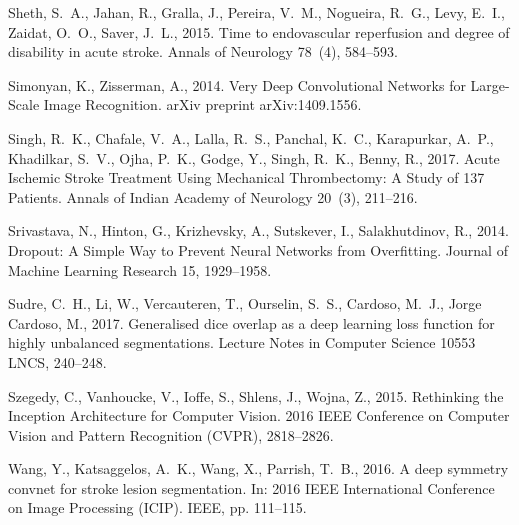 \documentclass[letterpaper,final,authoryear,3p,times,twocolumn]{elsarticle}
\begin{document}
\begin{thebibliography}{36}
Sheth, S.~A., Jahan, R., Gralla, J., Pereira, V.~M., Nogueira, R.~G., Levy,
  E.~I., Zaidat, O.~O., Saver, J.~L., 2015. {Time to endovascular reperfusion
  and degree of disability in acute stroke}. Annals of Neurology 78~(4),
  584--593.

Simonyan, K., Zisserman, A., 2014. {Very Deep Convolutional Networks for
  Large-Scale Image Recognition}. arXiv preprint arXiv:1409.1556.

Singh, R.~K., Chafale, V.~A., Lalla, R.~S., Panchal, K.~C., Karapurkar, A.~P.,
  Khadilkar, S.~V., Ojha, P.~K., Godge, Y., Singh, R.~K., Benny, R., 2017.
  {Acute Ischemic Stroke Treatment Using Mechanical Thrombectomy: A Study of
  137 Patients.} Annals of Indian Academy of Neurology 20~(3), 211--216.

Srivastava, N., Hinton, G., Krizhevsky, A., Sutskever, I., Salakhutdinov, R.,
  2014. {Dropout: A Simple Way to Prevent Neural Networks from Overfitting}.
  Journal of Machine Learning Research 15, 1929--1958.

Sudre, C.~H., Li, W., Vercauteren, T., Ourselin, S.~S., Cardoso, M.~J., {Jorge
  Cardoso}, M., 2017. {Generalised dice overlap as a deep learning loss
  function for highly unbalanced segmentations}. Lecture Notes in Computer
  Science 10553 LNCS, 240--248.

Szegedy, C., Vanhoucke, V., Ioffe, S., Shlens, J., Wojna, Z., 2015. {Rethinking
  the Inception Architecture for Computer Vision}. 2016 IEEE Conference on
  Computer Vision and Pattern Recognition (CVPR), 2818--2826.

Wang, Y., Katsaggelos, A.~K., Wang, X., Parrish, T.~B., 2016. {A deep symmetry
  convnet for stroke lesion segmentation}. In: 2016 IEEE International
  Conference on Image Processing (ICIP). IEEE, pp. 111--115.


\end{thebibliography}
\end{document}
